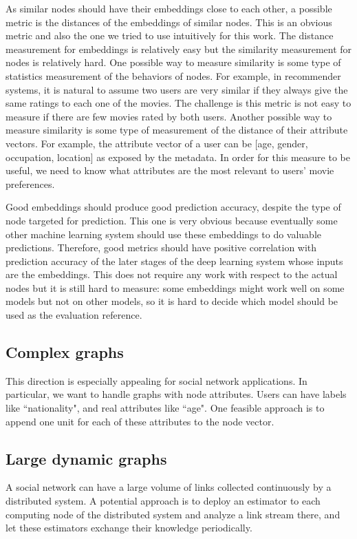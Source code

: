\documentclass[book,12pt]{WSUThesis}
\theoremstyle{definition}
\begin{document}
As similar nodes should have their embeddings close to each other, a possible metric is the distances of the embeddings of similar nodes.
This is an obvious metric and also the one we tried to use intuitively for this work.
The distance measurement for embeddings is relatively easy but the similarity measurement for nodes is relatively hard.
One possible way to measure similarity is some type of statistics measurement of the behaviors of nodes.
For example, in recommender systems, it is natural to assume two users are very similar if they always give the same ratings to each one of the movies.
The challenge is this metric is not easy to measure if there are few movies rated by both users.
Another possible way to measure similarity is some type of measurement of the distance of their attribute vectors.
For example, the attribute vector of a user can be [age, gender, occupation, location] as exposed by the metadata.
In order for this measure to be useful, we need to know what attributes are the most relevant to users' movie preferences.

Good embeddings should produce good prediction accuracy, despite the type of node targeted for prediction.
This one is very obvious because eventually some other machine learning system should use these embeddings to do valuable predictions.
Therefore, good metrics should have positive correlation with prediction accuracy of the later stages of the deep learning system whose inputs are the embeddings.
This does not require any work with respect to the actual nodes but it is still hard to measure: some embeddings might work well on some models but not on other models, so it is hard to decide which model should be used as the evaluation reference.

\subsection{Complex graphs}
This direction is especially appealing for social network applications.
In particular, we want to handle graphs with node attributes.
Users can have labels like ``nationality", and real attributes like ``age".
One feasible approach is to append one unit for each of these attributes to the node vector.

\subsection{Large dynamic graphs}
A social network can have a large volume of links collected continuously by a
distributed system.
A potential approach is to deploy an estimator to each computing node of
the distributed system and analyze a link stream there,
and let these estimators exchange their knowledge periodically.

\newpage

\let\WriteBookmarks\relax
{}


\end{document}
